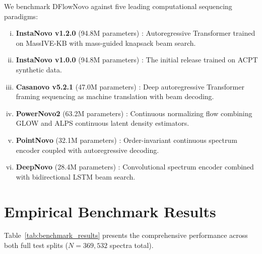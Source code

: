 We benchmark DFlowNovo against five leading computational sequencing paradigms:
\begin{enumerate}[(i)]
\item \textbf{InstaNovo v1.2.0} (94.8M parameters) \citep{Eloff2025}: Autoregressive Transformer trained on MassIVE-KB with mass-guided knapsack beam search.
\item \textbf{InstaNovo v1.0.0} (94.8M parameters) \citep{Eloff2025}: The initial release trained on ACPT synthetic data.
\item \textbf{Casanovo v5.2.1} (47.0M parameters) \citep{Yilmaz2022}: Deep autoregressive Transformer framing sequencing as machine translation with beam decoding.
\item \textbf{PowerNovo2} (63.2M parameters) \citep{Petrovskiy2026}: Continuous normalizing flow combining GLOW and ALPS continuous latent density estimators.
\item \textbf{PointNovo} (32.1M parameters) \citep{Qiao2021}: Order-invariant continuous spectrum encoder coupled with autoregressive decoding.
\item \textbf{DeepNovo} (28.4M parameters) \citep{Tran2017}: Convolutional spectrum encoder combined with bidirectional LSTM beam search.
\end{enumerate}

\section{Empirical Benchmark Results}

Table~\ref{tab:benchmark_results} presents the comprehensive performance across both full test splits ($N = 369,532$ spectra total).

